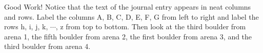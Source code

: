 Good Work!
Notice that the text of the journal entry appears in neat columns and rows. 
Label the columns A, B, C, D, E, F, G from left to right and label the rows h, i, j, k, \(\cdots\), z from top to bottom. 
Then look at the third boulder from arena 1, the fifth boulder from arena 2, the first boulder from arena 3, and the third boulder from arena 4.
